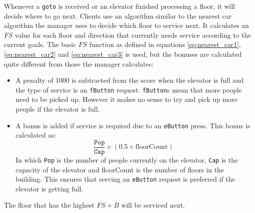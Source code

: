 \documentclass[a4paper,11pt,twocolumn]{article}
\begin{document}
Whenever a \texttt{goto} is received or an elevator finished processing a floor, it will decide where to go next. Clients use an algorithm similar to the nearest car algorithm the manager uses to decide which floor to service next. It calculates an $FS$ value for each floor and direction that currently needs service according to the current goals. The basic $FS$ function as defined in equations \ref{eq:nearest_car1}, \ref{eq:nearest_car2} and \ref{eq:nearest_car3} is used, but the bonuses are calculated quite different from those the manager calculates:
\begin{itemize}
 \item A penalty of 1000 is subtracted from the score when the elevator is full and the type of service is an \texttt{fButton} request. \texttt{fButton}s mean that more people need to be picked up. However it makes no sense to try and pick up more people if the elevator is full.
 \item A bonus is added if service is required due to an \texttt{eButton} press. This bonus is calculated as:
 \begin{equation}
  \frac{\texttt{Pop}}{\texttt{Cap}} \times (0.5 \times \text{floorCount})
 \end{equation}
 In which \texttt{Pop} is the number of people currently on the elevator, \texttt{Cap} is the capacity of the elevator and floorCount is the number of floors in the building. This ensures that serving an \texttt{eButton} request is preferred if the elevator is getting full. 
\end{itemize}
The floor that has the highest $FS + B$ will be serviced next. 
\end{document}
